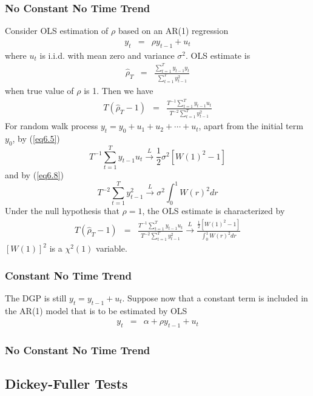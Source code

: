 \documentclass{article}
\begin{document}
\subsubsection{No Constant No Time Trend}
Consider OLS estimation of $\rho$ based on an AR(1) regression
\begin{eqnarray}
\label{eq4.13}
y_{t}&=&\rho y_{t-1}+u_{t}
\end{eqnarray}
where $u_{t}$ is i.i.d. with mean zero and variance $\sigma^{2}$. OLS estimate is
\begin{eqnarray*}
\hat{\rho}_{T}&=&\frac{\sum_{t=1}^{T}y_{t-1}y_{t}}{\sum_{t=1}^{T}y_{t-1}^{2}}
\end{eqnarray*}
when true value of $\rho$ is 1. Then we have
\begin{eqnarray*}
T\left(\hat{\rho}_{T}-1\right)&=&\frac{T^{-1}\sum_{t=1}^{T}y_{t-1}u_{t}}{T^{-2}\sum_{t=1}^{T}y_{t-1}^{2}}
\end{eqnarray*}
For random walk process $y_{t}=y_{0}+u_{1}+u_{2}+\cdots+u_{t}$, apart from the initial term $y_{0}$, by (\ref{eq6.5})
$$T^{-1}\sum_{t=1}^{T}y_{t-1}u_{t}\xrightarrow{L}\frac{1}{2}\sigma^{2} [W(1)^{2}-1]$$
and by (\ref{eq6.8})
$$T^{-2}\sum_{t=1}^{T}y_{t-1}^{2}\xrightarrow{L}\sigma^{2}\int_{0}^{1}W(r)^{2}dr$$
Under the null hypothesis that $\rho=1$, the OLS estimate is characterized by
\begin{eqnarray*}
T\left(\hat{\rho}_{T}-1\right)&=&\frac{T^{-1}\sum_{t=1}^{T}y_{t-1}u_{t}}{T^{-2}\sum_{t=1}^{T}y_{t-1}^{2}}\xrightarrow{L}\frac{\frac{1}{2}[W(1)^{2}-1]}{\int_{0}^{1}W(r)^{2}dr}
\end{eqnarray*}
$[W(1)]^{2}$ is a $\chi^{2}(1)$ variable. 


\subsubsection{Constant No Time Trend}
The DGP is still $y_{t}=y_{t-1}+u_{t}$. Suppose now that a constant term is included in the AR(1) model that is to be estimated by OLS
\begin{eqnarray*}
y_{t}&=&\alpha+\rho y_{t-1}+u_{t}
\end{eqnarray*}


\subsubsection{No Constant No Time Trend}

\subsection{Dickey-Fuller Tests}
\end{document}
